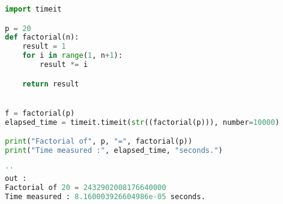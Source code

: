 \begin{lstlisting}[language=Python,label={lst:python-factorielle-10000},title={Programme de test en Python},
    escapeinside={''}]
import timeit

p = 20
def factorial(n):
    result = 1
    for i in range(1, n+1):
        result *= i

    return result


f = factorial(p)
elapsed_time = timeit.timeit(str((factorial(p))), number=10000)

print("Factorial of", p, "=", factorial(p))
print("Time measured :", elapsed_time, "seconds.")

''
out :
Factorial of 20 = 2432902008176640000
Time measured : 8.160003926604986e-05 seconds.
\end{lstlisting}